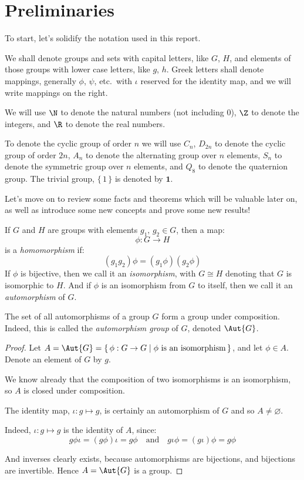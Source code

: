 \section{Preliminaries}
To start, let's solidify the notation used in this report.

We shall denote groups and sets with capital letters, like \(G\), \(H\), and elements of those groups with lower case
letters, like \(g\), \(h\).
Greek letters shall denote mappings, generally \(\phi\), \(\psi\), etc.\ with \(\iota\) reserved for the identity map,
and we will write mappings on the right.

We will use \(\N\) to denote the natural numbers (not including 0), \(\Z\) to denote the integers, and \(\R\) to denote
the real numbers.

To denote the cyclic group of order \(n\) we will use \(C_n\), \(D_{2n}\) to denote the cyclic group of order \(2n\),
\(A_n\) to denote the alternating group over \(n\) elements, \(S_n\) to denote the symmetric group over \(n\)
elements, and \(Q_8\) to denote the quaternion group.
The trivial group, \(\{\, 1\, \}\) is denoted by \(\bm{1}\).

Let's move on to review some facts and theorems which will be valuable later on, as well as introduce some new concepts
and prove some new results!


\begin{definition}
    If \(G\) and \(H\) are groups with elements \(g_1,\, g_2 \in G\), then a map:
    \[\phi:G \to H\]
    is a \emph{homomorphism} if:
    \[(g_1 g_2)\phi = (g_1\phi)(g_2\phi)\]
    If \(\phi\) is bijective, then we call it an \emph{isomorphism}, with \(G \cong H\) denoting that \(G\) is
    isomorphic to \(H\).
    And if \(\phi\) is an isomorphism from \(G\) to itself, then we call it an \emph{automorphism} of \(G\).
\end{definition}

\begin{lemma}
    The set of all automorphisms of a group \(G\) form a group under composition.
    Indeed, this is called the \emph{automorphism group} of \(G\), denoted \(\Aut{G}\).
\end{lemma}

\begin{proof}
    Let \(A = \Aut{G} = \{\,\phi:G \to G \mid \phi\ \text{is an isomorphism}\,\}\), and let \(\phi \in A\).
    Denote an element of \(G\) by \(g\).

    We know already that the composition of two isomorphisms is an isomorphism, so \(A\) is closed under composition.

    The identity map, \(\iota:g \mapsto g\), is certainly an automorphism of \(G\) and so \(A \neq \varnothing\).

    Indeed, \(\iota:g \mapsto g\) is the identity of \(A\), since:
    \[g\phi\iota = (g\phi)\iota = g\phi \quad \text{and} \quad g\iota\phi = (g\iota)\phi = g\phi\]

    And inverses clearly exists, because automorphisms are bijections, and bijections are invertible.
    Hence \(A = \Aut{G}\) is a group.
\end{proof}

